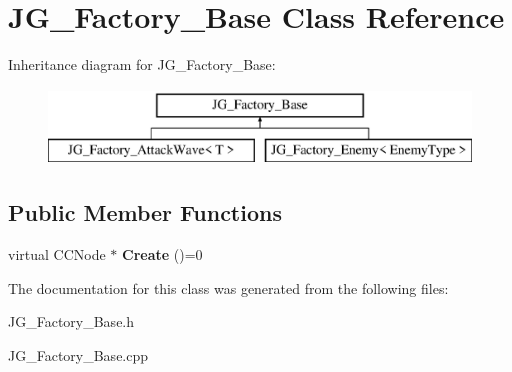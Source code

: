 \hypertarget{class_j_g___factory___base}{\section{J\-G\-\_\-\-Factory\-\_\-\-Base Class Reference}
\label{class_j_g___factory___base}
}
Inheritance diagram for J\-G\-\_\-\-Factory\-\_\-\-Base\-:\begin{figure}[H]
\begin{center}
\leavevmode
\includegraphics[height=2.000000cm]{class_j_g___factory___base}
\end{center}
\end{figure}
\subsection*{Public Member Functions}
\begin{DoxyCompactItemize}
\item 
\hypertarget{class_j_g___factory___base_af79850ce71f6e13af6d634fae32e862b}{virtual C\-C\-Node $\ast$ {\bfseries Create} ()=0}\label{class_j_g___factory___base_af79850ce71f6e13af6d634fae32e862b}

\end{DoxyCompactItemize}


The documentation for this class was generated from the following files\-:\begin{DoxyCompactItemize}
\item 
J\-G\-\_\-\-Factory\-\_\-\-Base.\-h\item 
J\-G\-\_\-\-Factory\-\_\-\-Base.\-cpp\end{DoxyCompactItemize}
